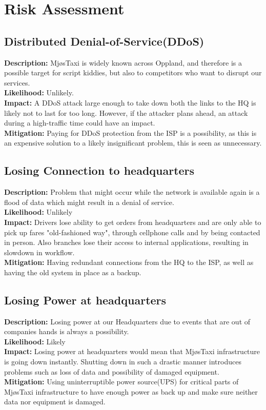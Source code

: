 \chapter{Risk Assessment}
\label{chap:riskAssesment}


\section{Distributed Denial-of-Service(DDoS)}
\textbf{Description:} MjøsTaxi is widely known across Oppland, and therefore is a possible target for script kiddies, but also to competitors who want to disrupt our services.  \\
\textbf{Likelihood:} Unlikely. \\
\textbf{Impact:} A DDoS attack large enough to take down both the links to the HQ is likely not to last for too long. However, if the attacker plans ahead, an attack during a high-traffic time could have an impact. \\
\textbf{Mitigation:} Paying for DDoS protection from the ISP is a possibility, as this is an expensive solution to a likely insignificant problem, this is seen as unnecessary.

\section{Losing Connection to headquarters}
\textbf{Description:} Problem that might occur while the network is available again is a flood of data which might result in a denial of service. \\
\textbf{Likelihood:} Unlikely\\
\textbf{Impact:} Drivers lose ability to get orders from headquarters and are only able to pick up fares "old-fashioned way", through cellphone calls and by being contacted in person. Also branches lose their access to internal applications, resulting in slowdown in workflow. \\
\textbf{Mitigation:} Having redundant connections from the HQ to the ISP, as well as having the old system in place as a backup.

\section{Losing Power at headquarters}
\textbf{Description:} Losing power at our Headquarters due to events that are out of companies hands is always a possibility.  \\
\textbf{Likelihood:} Likely \\
\textbf{Impact:} Losing power at headquarters would mean that MjøsTaxi infrastructure is going down instantly. Shutting down in such a drastic manner introduces problems such as loss of data and possibility of damaged equipment.\\
\textbf{Mitigation:} Using uninterruptible power source(UPS) for critical parts of MjøsTaxi infrastructure to have enough power as back up and make sure neither data nor equipment is damaged. \cite{poweroutage}

